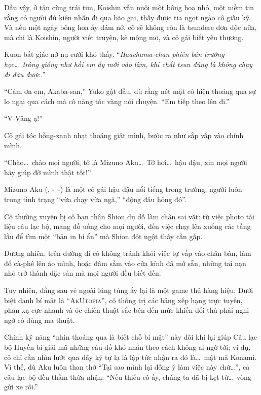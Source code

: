 \documentclass[../main.tex]{subfiles}
\begin{document}
Dẫu vậy, ở tận cùng trái tim, Koishin vẫn nuôi một bông hoa nhỏ, một niềm tin rằng có người đủ kiên nhẫn đi qua bão gai, thấy được tia ngọt ngào cô giấu kỹ. Và nếu một ngày bông hoa ấy dám nở, cô sẽ không còn là tsundere đơn độc nữa, mà chỉ là Koishin, người viết truyện, kẻ mộng mơ, và cô gái biết yêu thương.

\chrint

Kuon bất giác nở nụ cười khó thấy. ``\textit{Haachama-chan phiên bản trường học\dots\ trông giống như hồi em ấy mới vào làm, khí chất tsun đúng là không chạy đi đâu được.}''

``Cảm ơn em, Akaba-san,'' Yuko gật đầu, dù rằng nét mặt cô hiện thoáng qua sự lo ngại qua cách mà cô nàng tóc vàng nói chuyện. ``Em tiếp theo lên đi.''

``V-Vâng ạ!''

Cô gái tóc hồng-xanh nhạt thoáng giật mình, bước ra như sắp vấp vào chính mình.

``Chào\dots\ chào mọi người, tớ là Mizuno Aku\dots\ Tớ hơi\dots\ hậu đậu, xin mọi người hãy giúp đỡ mình thật tốt!''

\chrint

Mizuno Aku (, -\ -) là một cô gái hậu đậu nổi tiếng trong trường, người luôn trong tình trạng ``vừa chạy vừa ngã,'' ``động đâu hỏng đó''.

Cô thường xuyên bị cô bạn thân Shion dụ dỗ làm chân sai vặt: từ việc photo tài liệu câu lạc bộ, mang đồ uống cho mọi người, đến việc chạy lên xuống các tầng lầu để tìm một ``bản in bí ẩn'' mà Shion đột ngột thấy cần gấp.

Đương nhiên, trên đường đi cô không tránh khỏi việc tự vấp vào chân bàn, làm đổ cà-phê lên áo mình, hoặc đâm sầm vào cửa kính đã mở sẵn, những tai nạn nhỏ trở thành đặc sản mà mọi người đều biết đến.

Tuy nhiên, đằng sau vẻ ngoài lúng túng ấy lại là một game thủ hàng hiệu. Dưới biệt danh bí mật là ``\textsc{AkUtopia}'', cô thống trị các bảng xếp hạng trực tuyến, phản xạ cực nhanh và óc chiến thuật sắc bén đến mức khiến đối thủ phải nghi ngờ cô dùng ma thuật. %

Chính kỹ năng ``nhìn thoáng qua là biết chỗ bí mật'' này đôi khi lại giúp Câu lạc bộ Huyền bí giải mã những câu đố khó nhằn theo cách không ai ngờ tới; ví dụ, cô chỉ cần nhìn lướt qua dãy ký tự lạ là lập tức nhận ra đó là\dots\ mật mã Konami. Vì thế, dù Aku luôn than thở ``Tại sao mình lại đồng ý làm việc này chứ\dots'', cả câu lạc bộ đều thầm thừa nhận:  ``Nếu thiếu cô ấy, chúng ta đã bị kẹt từ\dots\ vòng gửi xe rồi.''
\end{document}

